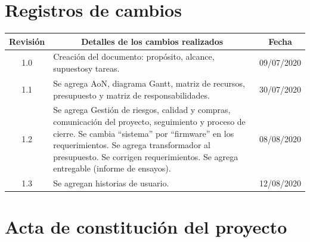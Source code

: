 \documentclass[11pt]{charter}
\begin{document}
\maketitle
\thispagestyle{empty}
\pagebreak


\thispagestyle{empty}
{\setlength{\parskip}{0pt}
\tableofcontents{}
}
\pagebreak


\section{Registros de cambios}
\label{sec:registro}


\begin{table}[ht]
\label{tab:registro}
\centering

\begin{tabularx}{\linewidth}{@{}|c|X|c|@{}}
\hline
\rowcolor[HTML]{C0C0C0} 
Revisión & \multicolumn{1}{c|}{\cellcolor[HTML]{C0C0C0}Detalles de los cambios realizados} & Fecha      \\ \hline
1.0      & Creación del documento: propósito, alcance, supuestos\newline                                                        y tareas. & 09/07/2020 \\ \hline
1.1      & Se agrega AoN, diagrama Gantt, matriz de recursos,\newline
presupuesto y matriz de responsabilidades. & 30/07/2020 \\ \hline
1.2      & Se agrega Gestión de riesgos, calidad y compras, comunicación \newline
del proyecto, seguimiento y proceso de cierre. \newline 
Se cambia ``sistema'' por ``firmware'' en los requerimientos. \newline
Se agrega transformador al presupuesto. \newline
Se corrigen requerimientos. \newline
Se agrega entregable (informe de ensayos). & 08/08/2020 \\ \hline
1.3      & Se agregan historias de usuario. & 12/08/2020 \\ \hline
\end{tabularx}
\end{table}

\pagebreak



\section{Acta de constitución del proyecto}
\label{sec:acta}
\end{document}
